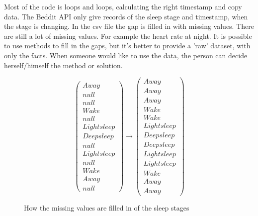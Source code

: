 			

			Most of the code is loops and loops, calculating the right timestamp and copy data. 
			The Beddit API only give records of the sleep stage and timestamp, when the stage is changing.
			In the csv file the gap is filled in with missing values. There are still a lot of missing values. For example the heart rate at night. It is possible to use methods to fill in the gaps, but it's better to provide a 'raw' dataset, with only the facts. When someone would like to use the data, the person can decide herself/himself the method or solution.
			\begin{figure}[h!]
			\[ 
				\left(
				\begin{array}{c}
				Away \\
				null \\
				null \\
				Wake \\
				null \\
				Light sleep \\
				Deep sleep \\
				null \\
				Light sleep \\
				null \\
				Wake \\
				Away \\
				null
				\end{array}
				\right)
				\to
				\left(
				\begin{array}{c}
				Away \\
				Away \\
				Away \\
				Wake \\
				Wake \\
				Light sleep \\
				Deep sleep \\
				Deep sleep \\
				Light sleep \\
				Light sleep \\
				Wake \\
				Away \\
				Away 
				\end{array}
				\right)
			\] 
			\caption{How the missing values are filled in of the sleep stages}
		\end{figure}



		
